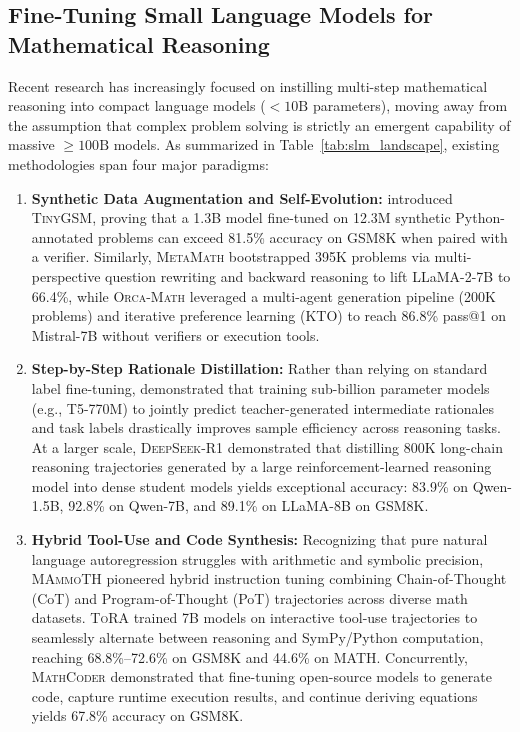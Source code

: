 \documentclass[11pt,a4paper]{article}
\begin{document}
\subsection{Fine-Tuning Small Language Models for Mathematical Reasoning}
Recent research has increasingly focused on instilling multi-step mathematical reasoning into compact language models ($<10\text{B}$ parameters), moving away from the assumption that complex problem solving is strictly an emergent capability of massive $\ge 100\text{B}$ models. As summarized in Table~\ref{tab:slm_landscape}, existing methodologies span four major paradigms:
\begin{enumerate}
    \item \textbf{Synthetic Data Augmentation and Self-Evolution:} \citet{li2023tinygsm} introduced \textsc{TinyGSM}, proving that a 1.3B model fine-tuned on 12.3M synthetic Python-annotated problems can exceed 81.5\% accuracy on GSM8K when paired with a verifier. Similarly, \textsc{MetaMath} \citep{yu2023metamath} bootstrapped 395K problems via multi-perspective question rewriting and backward reasoning to lift LLaMA-2-7B to 66.4\%, while \textsc{Orca-Math} \citep{mitra2024orcamath} leveraged a multi-agent generation pipeline (200K problems) and iterative preference learning (KTO) to reach 86.8\% pass@1 on Mistral-7B without verifiers or execution tools.
    \item \textbf{Step-by-Step Rationale Distillation:} Rather than relying on standard label fine-tuning, \citet{hsieh2023distilling} demonstrated that training sub-billion parameter models (e.g., T5-770M) to jointly predict teacher-generated intermediate rationales and task labels drastically improves sample efficiency across reasoning tasks. At a larger scale, \textsc{DeepSeek-R1} \citep{deepseek2025r1} demonstrated that distilling 800K long-chain reasoning trajectories generated by a large reinforcement-learned reasoning model into dense student models yields exceptional accuracy: 83.9\% on Qwen-1.5B, 92.8\% on Qwen-7B, and 89.1\% on LLaMA-8B on GSM8K.
    \item \textbf{Hybrid Tool-Use and Code Synthesis:} Recognizing that pure natural language autoregression struggles with arithmetic and symbolic precision, \textsc{MAmmoTH} \citep{yue2023mammoth} pioneered hybrid instruction tuning combining Chain-of-Thought (CoT) and Program-of-Thought (PoT) trajectories across diverse math datasets. \textsc{ToRA} \citep{gou2023tora} trained 7B models on interactive tool-use trajectories to seamlessly alternate between reasoning and SymPy/Python computation, reaching 68.8\%--72.6\% on GSM8K and 44.6\% on MATH. Concurrently, \textsc{MathCoder} \citep{wang2023mathcoder} demonstrated that fine-tuning open-source models to generate code, capture runtime execution results, and continue deriving equations yields 67.8\% accuracy on GSM8K.

\end{enumerate}
\end{document}
